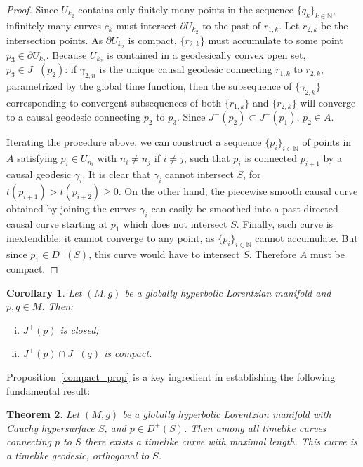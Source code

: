 \documentclass[10pt]{amsart}
\newcommand{\bbN}{\mathbb{N}}      %
\newtheorem{Thm}{Theorem}[section]
\newtheorem{Cor}[Thm]{Corollary}
\theoremstyle{definition}
\theoremstyle{remark}
\begin{document}
\begin{proof}
Since $U_{k_2}$ contains only finitely many points in the sequence $\{ q_k \}_{k \in \bbN}$, infinitely many curves $c_k$ must intersect $\partial U_{k_2}$ to the past of $r_{1,k}$. Let $r_{2,k}$ be the intersection points. As $\partial U_{k_2}$ is compact, $\{r_{2,k}\}$ must accumulate to some point $p_3 \in \partial U_{k_2}$. Because $\overline{U_{k_2}}$ is contained in a geodesically convex open set, $p_3 \in J^-(p_2)$: if $\gamma_{2,n}$ is the unique causal geodesic connecting $r_{1,k}$ to $r_{2,k}$, parametrized by the global time function, then the subsequence of $\{\gamma_{2,k}\}$ corresponding to convergent subsequences of both $\{r_{1,k}\}$ and $\{r_{2,k}\}$ will converge to a causal geodesic connecting $p_2$ to $p_3$. Since $J^-(p_2) \subset J^-(p_1)$, $p_2 \in A$.

Iterating the procedure above, we can construct a sequence $\{p_i\}_{i\in\bbN}$ of points in $A$ satisfying $p_i \in U_{n_i}$ with $n_i \neq n_j$ if $i \neq j$, such that $p_{i}$ is connected $p_{i+1}$ by a causal geodesic $\gamma_i$. It is clear that $\gamma_i$ cannot intersect $S$, for $t(p_{i+1}) > t(p_{i+2}) \geq 0$. On the other hand, the piecewise smooth causal curve obtained by joining the curves $\gamma_i$ can easily be smoothed into a past-directed causal curve starting at $p_1$ which does not intersect $S$. Finally, such curve is inextendible: it cannot converge to any point, as $\{p_i\}_{i\in\bbN}$ cannot accumulate. But since $p_1 \in D^+(S)$, this curve would have to intersect $S$. Therefore $A$ must be compact.
\end{proof}

\begin{Cor}
Let $(M,g)$ be a globally hyperbolic Lorentzian manifold and $p,q \in M$. Then:
\begin{enumerate}[(i)]
\item
$J^+(p)$ is closed;
\item
$J^+(p) \cap J^-(q)$ is compact.
\end{enumerate}
\end{Cor}

Proposition~\ref{compact_prop} is a key ingredient in establishing the following fundamental result:

\begin{Thm} \label{max_thm}
Let $(M,g)$ be a globally hyperbolic Lorentzian manifold with Cauchy hypersurface $S$, and $p \in D^+(S)$. Then among all timelike curves connecting $p$ to $S$ there exists a timelike curve with maximal length. This curve is a timelike geodesic, orthogonal to $S$.
\end{Thm}
\end{document}
